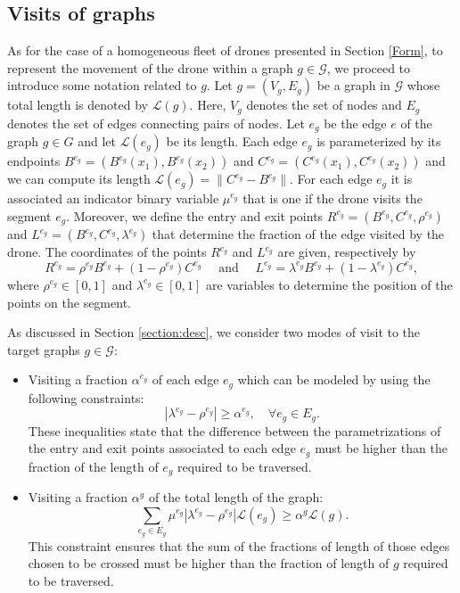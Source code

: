\subsection*{Visits of graphs}
\noindent
As for the case of a homogeneous fleet of drones presented in Section \ref{Form}, to represent the movement of the drone within a graph $g\in\mathcal G$, we proceed to introduce some notation related to $g$.
Let $g = (V_g, E_g)$ be a graph in $\mathcal G$ whose total length is denoted by $\mathcal L(g)$. Here, $V_g$ denotes the set of nodes and $E_g$ denotes the set of edges connecting pairs of nodes.  Let $e_g$ be the edge $e$ of the graph $g \in G$ and let $\mathcal  L(e_g)$ be its length. Each edge $e_g$ is parameterized by its endpoints $B^{e_g}= (B^{e_g}(x_1), B^{e_g}(x_2))$ and $C^{e_g}= (C^{e_g}(x_1), C^{e_g}(x_2))$ and we can compute its length $\mathcal L(e_g) =\|C^{e_g} -  B^{e_g}\|$. 
\noindent
For each edge $e_g$ it is associated an indicator binary variable $\mu^{e_g}$ that is one if the drone visits the segment $e_g$. Moreover, we define the entry and exit points $R^{e_g}=(B^{e_g},C^{e_g},\rho^{e_g})$ and $L^{e_g}=(B^{e_g},C^{e_g},\lambda^{e_g})$ that determine the fraction of the edge visited by the drone. The coordinates of the points $R^{e_g}$ and $L^{e_g}$ are given, respectively by 
$$R^{e_g} = \rho^{e_g} B^{e_g} + (1- \rho^{e_g})C^{e_g} \quad\text{ and }\quad L^{e_g} = \lambda^{e_g} B^{e_g} + (1- \lambda^{e_g})C^{e_g},$$ where $\rho^{e_g} \in [0,1]$ and $\lambda^{e_g} \in [0,1]$ are variables to determine the position of the points on the segment.

\noindent
As discussed in Section \ref{section:desc}, we consider two modes of visit to the target graphs $g\in \mathcal{G}$:
\begin{itemize}
    \item Visiting a fraction $\alpha^{e_g}$ of each edge $e_g$ which can be modeled by using the following constraints:
    \begin{equation}\label{eq:NOalphaE}\tag{$\alpha$-E}
    |\lambda^{e_g} - \rho^{e_g}|\geq \alpha^{e_g}, \quad \forall e_g\in E_g.
    \end{equation}
    These inequalities state that the difference between the parametrizations of the entry and exit points associated to each edge $e_g$ must be higher than the fraction of the length of $e_g$ required to be traversed.
    \item Visiting a fraction $\alpha^g$ of the total length of the graph:
    \begin{equation}\label{eq:NOalphaG}\tag{$\alpha$-G}
    \sum_{e_g\in E_g} \mu^{e_g}|\lambda^{e_g} - \rho^{e_g}|\mathcal L(e_g) \geq \alpha^g\mathcal L(g).
    \end{equation}
    \noindent
    This constraint ensures that the sum of the fractions of length of those edges chosen to be crossed must be higher than the fraction of length of $g$ required to be traversed.
\end{itemize}




